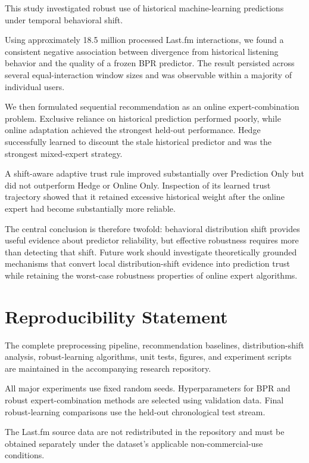 \documentclass[11pt]{article}
\begin{document}
This study investigated robust use of historical machine-learning
predictions under temporal behavioral shift.

Using approximately 18.5 million processed Last.fm interactions, we
found a consistent negative association between divergence from
historical listening behavior and the quality of a frozen BPR
predictor. The result persisted across several equal-interaction window
sizes and was observable within a majority of individual users.

We then formulated sequential recommendation as an online
expert-combination problem. Exclusive reliance on historical prediction
performed poorly, while online adaptation achieved the strongest
held-out performance. Hedge successfully learned to discount the stale
historical predictor and was the strongest mixed-expert strategy.

A shift-aware adaptive trust rule improved substantially over
Prediction Only but did not outperform Hedge or Online Only. Inspection
of its learned trust trajectory showed that it retained excessive
historical weight after the online expert had become substantially more
reliable.

The central conclusion is therefore twofold: behavioral distribution
shift provides useful evidence about predictor reliability, but
effective robustness requires more than detecting that shift. Future
work should investigate theoretically grounded mechanisms that convert
local distribution-shift evidence into prediction trust while retaining
the worst-case robustness properties of online expert algorithms.


\section*{Reproducibility Statement}

The complete preprocessing pipeline, recommendation baselines,
distribution-shift analysis, robust-learning algorithms, unit tests,
figures, and experiment scripts are maintained in the accompanying
research repository.

All major experiments use fixed random seeds. Hyperparameters for BPR
and robust expert-combination methods are selected using validation
data. Final robust-learning comparisons use the held-out chronological
test stream.

The Last.fm source data are not redistributed in the repository and
must be obtained separately under the dataset's applicable
non-commercial-use conditions.




\end{document}
